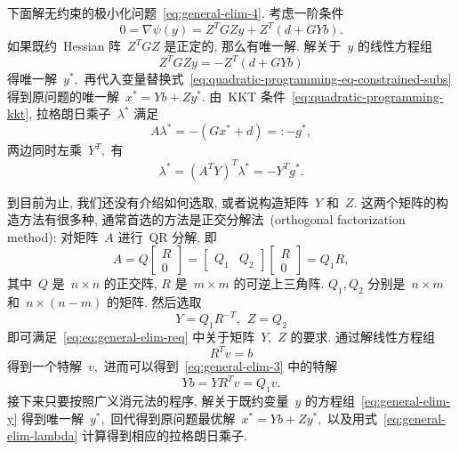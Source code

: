 下面解无约束的极小化问题~\eqref{eq:general-elim-4}. 考虑一阶条件
\begin{equation}
\label{eq:general-elim-5}
0 = \nabla \psi ({y}) = Z^T G Z {y} + Z^T \left( {d} + G Y {b} \right).
\end{equation}
如果既约~Hessian 阵~$Z^T G Z$ 是正定的, 那么有唯一解. 解关于~${y}$ 的线性方程组
\begin{equation}
\label{eq:general-elim-y}
Z^T G Z {y} = - Z^T \left( {d} + G Y {b} \right)
\end{equation}
得唯一解~${y}^*,$ 再代入变量替换式~\eqref{eq:quadratic-programming-eq-constrained-subs} 得到原问题的唯一解~${x}^* = Y {b} + Z {y}^*.$ 由~KKT 条件~\eqref{eq:quadratic-programming-kkt}, 拉格朗日乘子~${\lambda}^*$ 满足
\begin{equation}
\label{eq:general-elim-lagrange}
A {\lambda}^* = -\left( G {x}^* + {d} \right) =: - {g}^*,
\end{equation}
两边同时左乘~$Y^T,$ 有
\begin{equation}
\label{eq:general-elim-lambda}
{\lambda}^* = \left( A^T Y \right)^T {\lambda}^* = -Y^T {g}^*.
\end{equation}

到目前为止, 我们还没有介绍如何选取, 或者说构造矩阵~$Y$ 和~$Z.$ 这两个矩阵的构造方法有很多种, 通常首选的方法是正交分解法~(orthogonal factorization method): 对矩阵~$A$ 进行~QR 分解, 即
\begin{equation}
\label{eq:quadratic-programming-qr-decomp-1}
A = Q \begin{bmatrix} R \\ 0 \end{bmatrix} = \begin{bmatrix} Q_1 & Q_2 \end{bmatrix} \begin{bmatrix} R \\ 0 \end{bmatrix} = Q_1 R,
\end{equation}
其中~$Q$ 是~$n \times n$ 的正交阵, $R$ 是~$m \times m$ 的可逆上三角阵. $Q_1, Q_2$ 分别是~$n \times m$ 和~$n \times (n - m)$ 的矩阵. 然后选取
\begin{equation}
\label{eq:quadratic-programming-qr-decomp-2}
Y = Q_1 R^{-T}, ~~ Z = Q_2
\end{equation}
即可满足~\eqref{eq:eq:general-elim-req} 中关于矩阵~$Y,$ $Z$ 的要求. 通过解线性方程组
\begin{equation*}
R^T {v} = {b}
\end{equation*}
得到一个特解~${v},$ 进而可以得到~\eqref{eq:general-elim-3} 中的特解
\begin{equation*}
Y {b} = Y R^T {v} = Q_1 {v}.
\end{equation*}
接下来只要按照广义消元法的程序, 解关于既约变量~${y}$ 的方程组~\eqref{eq:general-elim-y} 得到唯一解~${y}^*,$ 回代得到原问题最优解~${x}^* = Y {b} + Z {y}^*,$
以及用式~\eqref{eq:general-elim-lambda} 计算得到相应的拉格朗日乘子.


